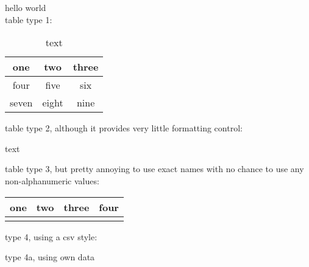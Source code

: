 \documentclass{article}
\begin{document}
\def \b #1{\textbf{#1}} 
hello world\\

table type 1: 

\begin{table}[h]
	\centering
	\caption{text}
	\begin{tabular}{|c|c|c|}
		\hline
		\b{one}   & \b{two}   & \b{three} \\ \hline
		four  & five  & six   \\ \hline
		seven & eight & nine  \\ \hline
	\end{tabular}
\end{table}


table type 2, although it provides very little formatting control: 

\begin{table}[h]
	\centering
	\caption{text}
\end{table}

table type 3, but pretty annoying to use exact names with no chance to use any non-alphanumeric values: 

\begin{table}[h]
	\centering
\begin{tabular}{|c|c|c|c|}\hline
	\bfseries one &\bfseries two &\bfseries three &\bfseries four
	\csvreader[head to column names]{economics.csv}{}
	{\\\hline\Name & \lidar & \stereoA & \stereoB} %
	\\\hline
\end{tabular}
\end{table}


type 4, using a csv style: \\
%

type 4a, using own data\\
%
\end{document}
